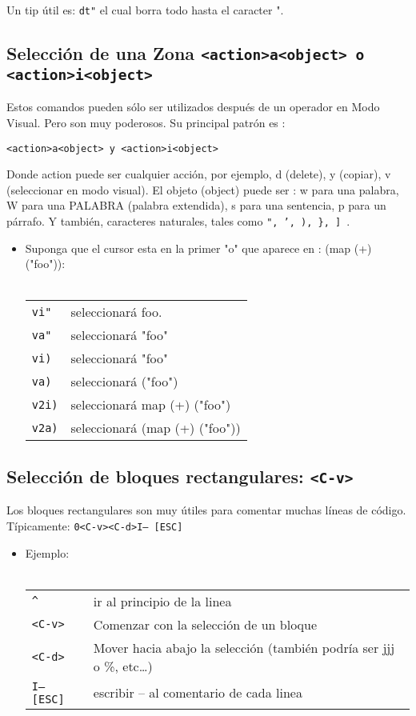 Un tip útil es: \texttt{dt"}  el cual borra todo hasta el caracter ".

\subsection{Selección de una Zona \texttt{<action>a<object> o <action>i<object>}}


Estos comandos pueden sólo ser utilizados después de un operador en Modo Visual. Pero son muy poderosos. Su principal patrón es :

\texttt{<action>a<object> y <action>i<object>}


Donde action puede ser cualquier acción, por ejemplo, d (delete), y (copiar), v (seleccionar en modo visual). El objeto (object) puede ser : w para una palabra, W para una PALABRA (palabra extendida), s para una sentencia, p para un párrafo. Y también, caracteres naturales, tales como \texttt{", ', ), \}, ] }.


\begin{itemize}
	\item Suponga que el cursor esta en la primer "o" que aparece en :  (map (+) ("foo")): \\ \\
\begin{tabular}{ l l }
	\texttt{vi"} & seleccionará foo. \\
	\texttt{va"} & seleccionará "foo" \\
	\texttt{vi)} & seleccionará "foo" \\
	\texttt{va)} & seleccionará ("foo") \\
	\texttt{v2i)} & seleccionará map (+) ("foo") \\
	\texttt{v2a)} & seleccionará (map (+) ("foo")) \\
\end{tabular}
\end{itemize}




\subsection{Selección de bloques rectangulares: \texttt{<C-v>}}


Los bloques rectangulares son muy útiles para comentar muchas
líneas de código. Típicamente:  \texttt{0<C-v><C-d>I-- [ESC]}

\begin{itemize}
	\item Ejemplo: \\ \\
\begin{tabular}{ l l }
	\texttt{\^} & ir al principio de la linea \\
	\texttt{<C-v>} & Comenzar con la selección de un bloque \\
	\texttt{<C-d>} & Mover hacia abajo la selección (también podría ser jjj o \%, etc…) \\
	\texttt{I-- [ESC]} & escribir -- al comentario de cada linea \\
\end{tabular}
\end{itemize}




